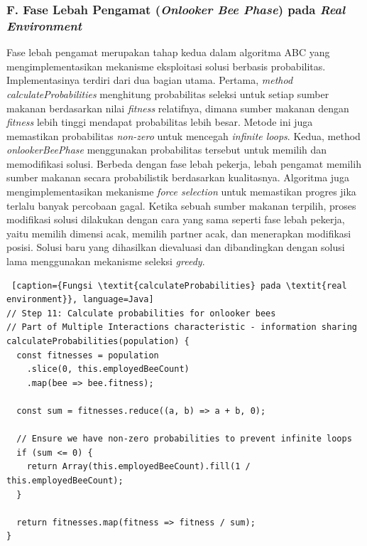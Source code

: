 \subsubsection{F. Fase Lebah Pengamat (\textit{Onlooker Bee Phase}) pada \textit{Real Environment}}
Fase lebah pengamat merupakan tahap kedua dalam algoritma ABC yang mengimplementasikan mekanisme eksploitasi solusi berbasis probabilitas. Implementasinya terdiri dari dua bagian utama. Pertama, \textit{method calculateProbabilities} menghitung probabilitas seleksi untuk setiap sumber makanan berdasarkan nilai \textit{fitness} relatifnya, dimana sumber makanan dengan \textit{fitness} lebih tinggi mendapat probabilitas lebih besar. Metode ini juga memastikan probabilitas \textit{non-zero} untuk mencegah \textit{infinite loops}. Kedua, method \textit{onlookerBeePhase} menggunakan probabilitas tersebut untuk memilih dan memodifikasi solusi. Berbeda dengan fase lebah pekerja, lebah pengamat memilih sumber makanan secara probabilistik berdasarkan kualitasnya. Algoritma juga mengimplementasikan mekanisme \textit{force selection} untuk memastikan progres jika terlalu banyak percobaan gagal. Ketika sebuah sumber makanan terpilih, proses modifikasi solusi dilakukan dengan cara yang sama seperti fase lebah pekerja, yaitu memilih dimensi acak, memilih partner acak, dan menerapkan modifikasi posisi. Solusi baru yang dihasilkan dievaluasi dan dibandingkan dengan solusi lama menggunakan mekanisme seleksi \textit{greedy}.
 
\begin{lstlisting} [caption={Fungsi \textit{calculateProbabilities} pada \textit{real environment}}, language=Java]
// Step 11: Calculate probabilities for onlooker bees
// Part of Multiple Interactions characteristic - information sharing
calculateProbabilities(population) {
  const fitnesses = population
    .slice(0, this.employedBeeCount)
    .map(bee => bee.fitness);
  
  const sum = fitnesses.reduce((a, b) => a + b, 0);
  
  // Ensure we have non-zero probabilities to prevent infinite loops
  if (sum <= 0) {
    return Array(this.employedBeeCount).fill(1 / this.employedBeeCount);
  }
  
  return fitnesses.map(fitness => fitness / sum);
}
\end{lstlisting}

